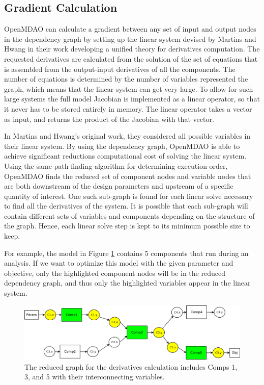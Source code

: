 \documentclass[]{aiaa-tc} %
\begin{document}
    \subsection{Gradient Calculation}

    OpenMDAO can calculate a gradient between any set of input and output nodes in the
    dependency graph by setting up the linear system devised by Martins and Hwang \cite{Martins2012} in their
    work developing a unified theory for derivatives computation.
    The requested derivatives are calculated from the solution of the set of equations that is assembled
    from the output-input derivatives of all the components. The number of equations
    is determined by the number of variables represented the graph, which means that the linear
    system can get very large. To allow for such large systems the full model Jacobian is implemented as
    a linear operator, so that it never has to be stored entirely in memory. The
    linear operator takes a vector as input, and returns the product of the Jacobian with that vector.

    In Martins and Hwang's original work, they considered all possible variables in their linear system.
    By using the dependency graph, OpenMDAO is able to achieve significant reductions computational cost of
    solving the linear system. Using the same path finding algorithm for determining execution order,
    OpenMDAO finds the reduced set of component nodes and variable nodes that are both downstream of the design parameters
    and upstream of a specific quantity of interest. One such sub-graph is found for each linear solve necessary to
    find all the derivatives of the system. It is possible that each sub-graph will contain different sets
    of variables and components depending on the structure of the graph. Hence, each linear solve step
    is kept to its minimum possible size to keep.

    For example, the model in Figure \ref{fig:graph2} contains 5 components that run during an analysis. If we
    want to optimize this model with the given parameter and objective, only the highlighted component nodes
    will be in the reduced dependency graph, and thus only the highlighted variables appear in the linear
    system.

    \begin{figure}[!htb]\begin{center}
      \includegraphics[width=.8\textwidth]{images/Graph2}
      \caption{ The reduced graph for the derivatives calculation includes Comps 1, 3, and 5 with their interconnecting variables. \label{fig:graph2}}
    \end{center}\end{figure}
\end{document}
